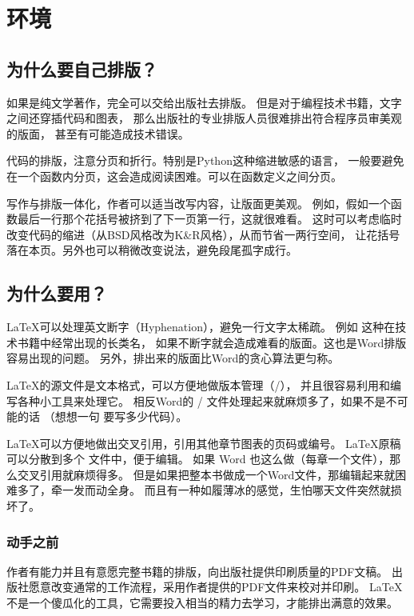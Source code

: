 \chapter{环境}

\section{为什么要自己排版？}
\label{sec:whyTypesetting}

如果是纯文学著作，完全可以交给出版社去排版。
但是对于编程技术书籍，文字之间还穿插代码和图表，
那么出版社的专业排版人员很难排出符合程序员审美观的版面，
甚至有可能造成技术错误。


\begindot
\item 代码的排版，注意分页和折行。特别是Python这种缩进敏感的语言，
一般要避免在一个函数内分页，这会造成阅读困难。可以在函数定义之间分页。

\item 写作与排版一体化，作者可以适当改写内容，让版面更美观。
例如，假如一个函数最后一行那个花括号被挤到了下一页第一行，这就很难看。
这时可以考虑临时改变代码的缩进（从BSD风格改为K\&R风格），从而节省一两行空间，
让花括号落在本页。另外也可以稍微改变说法，避免段尾孤字成行。
\myenddot


\section{为什么要用？}
\begindot
\item \LaTeX 可以处理英文断字（Hyphenation），避免一行文字太稀疏。
例如 这种在技术书籍中经常出现的长类名，
如果不断字就会造成难看的版面。这也是Word排版容易出现的问题。
另外，排出来的版面比Word的贪心算法更匀称。

\item \LaTeX 的源文件是文本格式，可以方便地做版本管理（/），
并且很容易利用和编写各种小工具来处理它。
相反Word的 / 文件处理起来就麻烦多了，如果不是不可能的话
（想想一句  要写多少代码）。

\item \LaTeX 可以方便地做出交叉引用，引用其他章节图表的页码或编号。
\LaTeX 原稿可以分散到多个  文件中，便于编辑。
如果 Word 也这么做（每章一个文件），那么交叉引用就麻烦得多。
但是如果把整本书做成一个Word文件，那编辑起来就困难多了，牵一发而动全身。
而且有一种如履薄冰的感觉，生怕哪天文件突然就损坏了。
\myenddot

\subsection{动手之前}
作者有能力并且有意愿完整书籍的排版，向出版社提供印刷质量的PDF文稿。
出版社愿意改变通常的工作流程，采用作者提供的PDF文件来校对并印刷。
\LaTeX 不是一个傻瓜化的工具，它需要投入相当的精力去学习，才能排出满意的效果。

